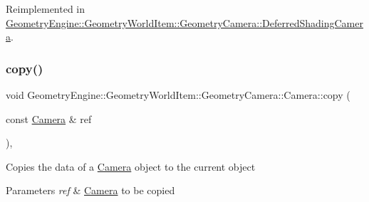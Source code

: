 Reimplemented in \mbox{\hyperlink{class_geometry_engine_1_1_geometry_world_item_1_1_geometry_camera_1_1_deferred_shading_camera_ac020fe14bc32f3fdbd0c9423af1c975f}{Geometry\+Engine\+::\+Geometry\+World\+Item\+::\+Geometry\+Camera\+::\+Deferred\+Shading\+Camera}}.

\mbox{\label{class_geometry_engine_1_1_geometry_world_item_1_1_geometry_camera_1_1_camera_a821e388a441a9b4a80e8384fc79170e3}} 
\subsubsection{\texorpdfstring{copy()}{copy()}}
{\footnotesize\ttfamily void Geometry\+Engine\+::\+Geometry\+World\+Item\+::\+Geometry\+Camera\+::\+Camera\+::copy (\begin{DoxyParamCaption}\item[{const \mbox{\hyperlink{class_geometry_engine_1_1_geometry_world_item_1_1_geometry_camera_1_1_camera}{Camera}} \&}]{ref }\end{DoxyParamCaption})\hspace{0.3cm}{\ttfamily [protected]}, {\ttfamily [virtual]}}

Copies the data of a \mbox{\hyperlink{class_geometry_engine_1_1_geometry_world_item_1_1_geometry_camera_1_1_camera}{Camera}} object to the current object 
\begin{DoxyParams}{Parameters}
{\em ref} & \mbox{\hyperlink{class_geometry_engine_1_1_geometry_world_item_1_1_geometry_camera_1_1_camera}{Camera}} to be copied \\
\hline
\end{DoxyParams}
\mbox{\label{class_geometry_engine_1_1_geometry_world_item_1_1_geometry_camera_1_1_camera_a55464c946d6e07ea8f00f5236593ee5f}} 
